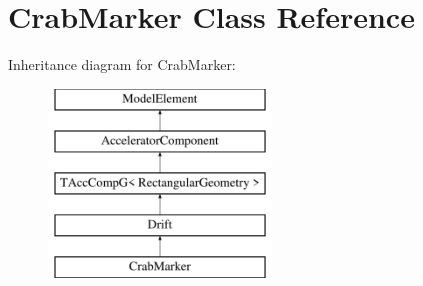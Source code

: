 \hypertarget{classCrabMarker}{}\section{Crab\+Marker Class Reference}
\label{classCrabMarker}
Inheritance diagram for Crab\+Marker\+:\begin{figure}[H]
\begin{center}
\leavevmode
\includegraphics[height=5.000000cm]{classCrabMarker}
\end{center}
\end{figure}
